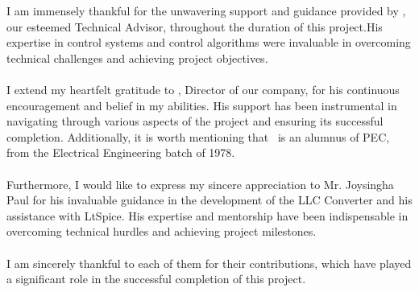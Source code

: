 I am immensely thankful for the unwavering support and guidance provided by
\industry, our esteemed Technical Advisor, throughout the duration of this
project.His expertise in control systems and control algorithms were invaluable
in overcoming technical challenges and achieving project objectives.\\
\\
I extend my heartfelt gratitude to \director, Director of our company, for his
continuous encouragement and belief in my abilities. His support has been
instrumental in navigating through various aspects of the project and ensuring
its successful completion. Additionally, it is worth mentioning that \director\
is an alumnus of PEC, from the Electrical Engineering batch of 1978.\\
\\
Furthermore, I would like to express my sincere appreciation to Mr. Joysingha Paul
for his invaluable guidance in the development of the LLC Converter and his assistance
with LtSpice. His expertise and mentorship have been indispensable in overcoming
technical hurdles and achieving project milestones.\\
\\
I am sincerely thankful to each of them for their contributions, which have
played a significant role in the successful completion of this project.
\\
\vfill
\vspace*{5cm}
\begin{minipage}[t]{1\textwidth}
    \raggedleft
    \name \\
    \sid
\end{minipage}